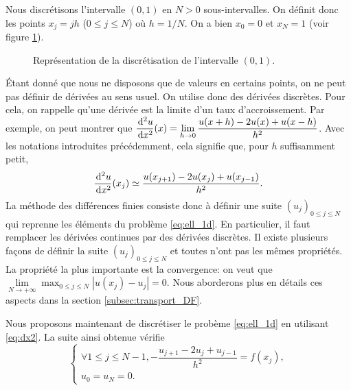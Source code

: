 \documentclass[12pt,a4paper,twoside]{article}
\begin{document}
Nous discr\'etisons l'intervalle $(0,1)$ en $N>0$ sous-intervalles.
On d\'efinit donc les points $x_j = j h$ ($0 \leq j \leq N$) o\`u $h = 1/N$.
On a bien $x_0 = 0$ et $x_N = 1$ (voir figure \ref{fig:disc_x}).

\begin{figure}
\centering
{} 
\caption{Repr\'esentation de la discr\'etisation de l'intervalle $(0,1)$.}
\label{fig:disc_x}
\end{figure}


\'Etant donn\'e que nous ne disposons que de valeurs en certains points, on ne peut
pas d\'efinir de d\'eriv\'ees au sens usuel. On utilise donc des d\'eriv\'ees discr\`etes.
Pour cela, on rappelle qu'une d\'eriv\'ee est la limite d'un taux d'accroissement.
Par exemple, on peut montrer que 
$\dfrac{\!\;\mathrm{d}^2 u}{\!\;\mathrm{d} x^2}(x) 
= \lim\limits_{h \to 0} \dfrac{u(x+h) - 2 u(x) + u(x-h)}{h^2}$.
Avec les notations introduites pr\'ec\'edemment, cela signifie que,
pour $h$ suffisamment petit, 
\begin{align}
  \label{eq:dx2}
  \dfrac{\!\;\mathrm{d}^2 u}{\!\;\mathrm{d} x^2}(x_j) \simeq \dfrac{u(x_{j+1}) - 2 u(x_j) + u(x_{j-1})}{h^2} .
\end{align}
La m\'ethode des diff\'erences finies consiste donc \`a d\'efinir une suite $(u_j)_{0\leq j \leq N}$
qui reprenne les \'el\'ements du probl\`eme \eqref{eq:ell_1d}. En particulier, il faut remplacer
les d\'eriv\'ees continues par des d\'eriv\'ees discr\`etes.
Il existe plusieurs fa\c{c}ons de d\'efinir la suite $(u_j)_{0\leq j \leq N}$ et toutes
n'ont pas les m\^emes propri\'et\'es. La propri\'et\'e la plus importante est la convergence:
on veut que $\lim\limits_{N \to +\infty} \max_{0 \leq j \leq N} | u(x_j) - u_j | = 0$.
Nous aborderons plus en d\'etails ces aspects dans la section \ref{subsec:transport_DF}.


Nous proposons maintenant de discr\'etiser le prob\`eme \eqref{eq:ell_1d}
en utilisant \eqref{eq:dx2}.
La suite ainsi obtenue v\'erifie
\begin{equation}
  \label{eq:ell_DF}
  \left\{
    \begin{array}{l}
      \forall 1 \leq j \leq N-1 , - \dfrac{u_{j+1} - 2 u_j + u_{j-1}}{h^2} = f(x_j) ,
      \\
      u_0 = u_N = 0 .
    \end{array}
  \right.
\end{equation}
\end{document}
